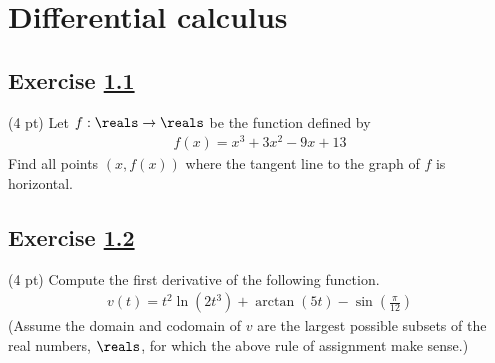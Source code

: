\newpage



%
%

\section{Differential calculus}

\subsection{Exercise \ref{sec : Differential Calculus Q1}}
\label{sec : Differential Calculus Q1}


(4 pt) Let $f : \reals \rightarrow \reals$ be the function defined by
\begin{align*}
f(x)
=
x^{3} + 3 x^{2} - 9 x + 13
\end{align*}
Find all points $(x,f(x))$ where the tangent line to the graph of $f$ is horizontal.




\subsection{Exercise \ref{sec : Differential Calculus Q2}}
\label{sec : Differential Calculus Q2}


(4 pt) Compute the first derivative of the following function.
\begin{align*}
v(t)
=
t^{2} \ln(2 t^{3}) + \arctan(5 t) - \sin\left(\frac{\pi}{12}\right)
\end{align*}
(Assume the domain and codomain of $v$ are the largest possible subsets of the real numbers, $\reals$, for which the above rule of assignment make sense.) 

